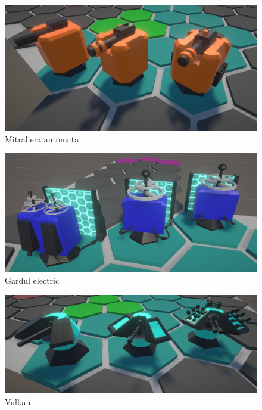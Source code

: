 \documentclass[12pt, a4paper]{article}
\begin{document}
	
	\begin{figure}[H]
		\centering
		\includegraphics[width=1\textwidth]{machineGun.png}
		\caption{Mitraliera automata}
		\label{fig: machineGun}
	\end{figure}

	\begin{figure}[H]
		\centering
		\includegraphics[width=1\textwidth]{electricFence.png}
		\caption{Gardul electric}
		\label{fig: electricFence}
	\end{figure}

	\begin{figure}[H]
		\centering
		\includegraphics[width=1\textwidth]{vulkan.png}
		\caption{Vulkan}
		\label{fig: vulkan}
	\end{figure}
\end{document}
